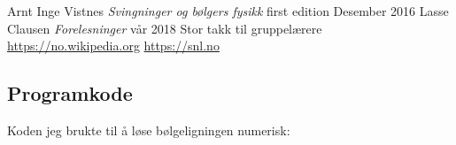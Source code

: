 \documentclass[a4paper,12pt,norsk]{article}
\begin{document}
\begin{thebibliography}{}
	Arnt Inge Vistnes
	\textit{Svingninger og bølgers fysikk}
	first edition
	Desember 2016
	Lasse Clausen
	\textit{Forelesninger}
	vår 2018
	Stor takk til gruppelærere
	\url{https://no.wikipedia.org}
	\url{https://snl.no}

\end{thebibliography}

\newpage
\begin{appendices}
\appendix
\section{Programkode}
Koden jeg brukte til å løse bølgeligningen numerisk:


\end{appendices}
\end{document}
